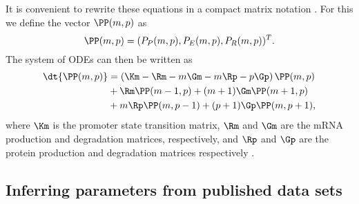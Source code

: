 
It is convenient to rewrite these equations in a compact matrix notation
\cite{Sanchez2013}. For this we define the vector $\PP(m, p)$ as
\begin{equation}
  \PP(m, p) = (P_P(m, p), P_E(m, p), P_R(m, p))^T.
\end{equation}
The system of ODEs can then be written as
\begin{equation}
  \begin{aligned}
    \dt{\PP(m, p)} &= \left( \Km -\Rm -m\Gm -m\Rp -p\Gp \right) \PP(m, p)\\
    &+ \Rm \PP(m-1, p)
    + (m + 1) \Gm \PP(m + 1, p)\\
    &+ m \Rp \PP(m, p - 1)
    + (p + 1) \Gp \PP(m, p + 1),
  \end{aligned}
  \label{eq_cme_matrix}
\end{equation}
where $\Km$ is the promoter state transition matrix, $\Rm$ and $\Gm$ are the
mRNA production and degradation matrices, respectively, and $\Rp$ and $\Gp$ are
the protein production and degradation matrices respectively .

\subsection*{Inferring parameters from published data sets}

